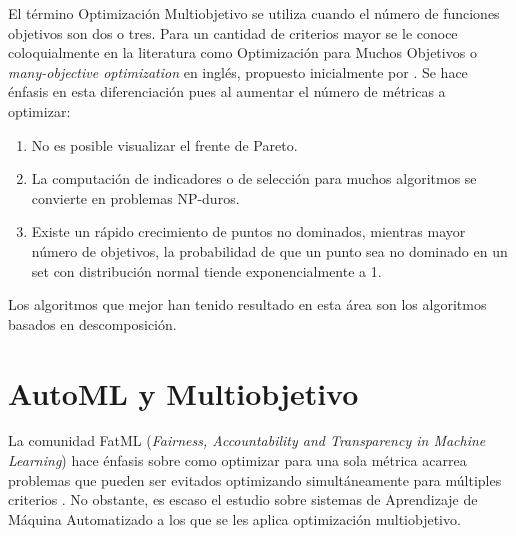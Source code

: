  El t\'ermino Optimizaci\'on Multiobjetivo se utiliza cuando el n\'umero de funciones objetivos son dos o tres. Para un cantidad de criterios mayor se le conoce coloquialmente en la literatura como Optimizaci\'on para Muchos Objetivos o \textit{many-objective optimization} en ingl\'es, propuesto inicialmente por . Se hace \'enfasis en esta diferenciaci\'on pues al aumentar el n\'umero de m\'etricas a optimizar:
 \begin{enumerate}
     \item No es posible visualizar el frente de Pareto.
     \item La computaci\'on de indicadores o de selecci\'on para muchos algoritmos se convierte en problemas NP-duros.
     \item Existe un r\'apido crecimiento de puntos no dominados, mientras mayor n\'umero de objetivos, la probabilidad de que un punto sea no dominado en un set con distribuci\'on normal tiende exponencialmente a 1.
 \end{enumerate}

Los algoritmos que mejor han tenido resultado en esta \'area son los algoritmos basados en descomposici\'on.


\section{AutoML y Multiobjetivo}\label{background:mooautoml}

La comunidad FatML (\textit{Fairness, Accountability and Transparency in Machine Learning}) hace \'enfasis sobre como optimizar para una sola m\'etrica acarrea problemas que pueden ser evitados optimizando simult\'aneamente para m\'ultiples criterios . No obstante, es escaso el estudio sobre sistemas de Aprendizaje de M\'aquina Automatizado a los que se les aplica optimizaci\'on multiobjetivo.

